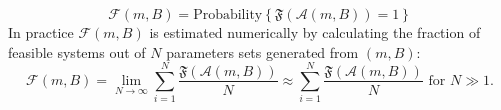 \documentclass[12pt, titlepage]{report}
\begin{document}
\begin{equation}{
\mathcal{F}(m, B)=\text{Probability}\left\{\mathfrak{F}\left(\mathcal{A}(m, B)\right)=1\right\} \label{eq : feasibility methods feasibility metaparameters function}
}
\end{equation}
In practice $\mathcal{F}(m, B)$ is estimated numerically by calculating the fraction of feasible systems out of $N$ parameters sets generated from $(m,B)$:
\begin{equation}
\mathcal{F}(m, B) = \lim_{N\rightarrow \infty} \sum_{i=1}^N \frac{\mathfrak{F}(\mathcal{A}(m,B))}{N} \approx \sum_{i=1}^N \frac{\mathfrak{F}(\mathcal{A}(m,B))}{N} \text{ for } N \gg 1.
\end{equation}
\end{document}
